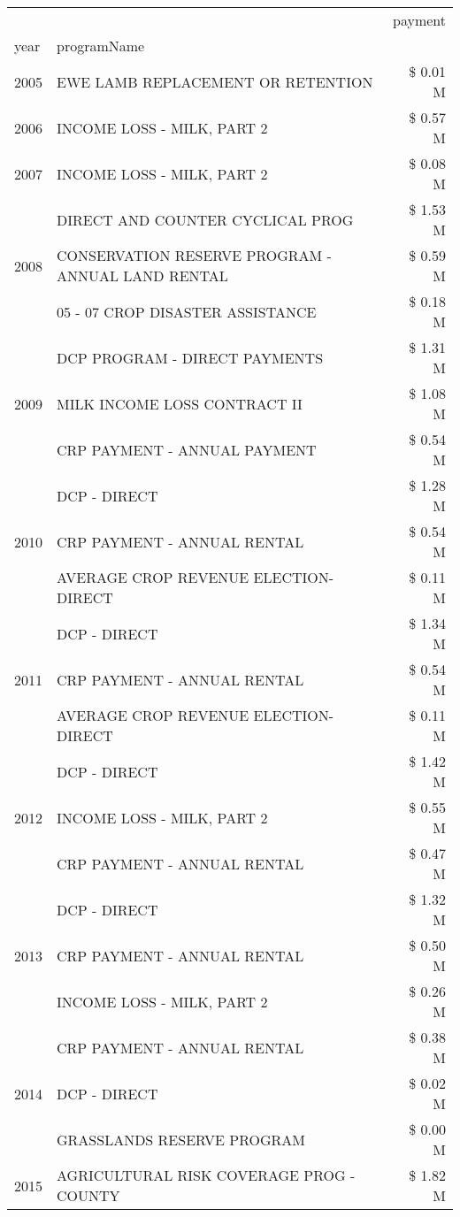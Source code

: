 \begin{tabular}{llr}
\toprule
 &  & payment \\
year & programName &  \\
\midrule
2005 & EWE LAMB REPLACEMENT OR RETENTION & \$ 0.01 M \\
\cline{1-3}
2006 & INCOME LOSS - MILK, PART 2 & \$ 0.57 M \\
\cline{1-3}
2007 & INCOME LOSS - MILK, PART 2 & \$ 0.08 M \\
\cline{1-3}
\multirow[t]{3}{*}{2008} & DIRECT AND COUNTER CYCLICAL PROG & \$ 1.53 M \\
 & CONSERVATION RESERVE PROGRAM - ANNUAL LAND RENTAL & \$ 0.59 M \\
 & 05 - 07 CROP DISASTER ASSISTANCE & \$ 0.18 M \\
\cline{1-3}
\multirow[t]{3}{*}{2009} & DCP PROGRAM - DIRECT PAYMENTS & \$ 1.31 M \\
 & MILK INCOME LOSS CONTRACT II & \$ 1.08 M \\
 & CRP PAYMENT - ANNUAL PAYMENT & \$ 0.54 M \\
\cline{1-3}
\multirow[t]{3}{*}{2010} & DCP - DIRECT & \$ 1.28 M \\
 & CRP PAYMENT - ANNUAL RENTAL & \$ 0.54 M \\
 & AVERAGE CROP REVENUE ELECTION-DIRECT & \$ 0.11 M \\
\cline{1-3}
\multirow[t]{3}{*}{2011} & DCP - DIRECT & \$ 1.34 M \\
 & CRP PAYMENT - ANNUAL RENTAL & \$ 0.54 M \\
 & AVERAGE CROP REVENUE ELECTION-DIRECT & \$ 0.11 M \\
\cline{1-3}
\multirow[t]{3}{*}{2012} & DCP - DIRECT & \$ 1.42 M \\
 & INCOME LOSS - MILK, PART 2 & \$ 0.55 M \\
 & CRP PAYMENT - ANNUAL RENTAL & \$ 0.47 M \\
\cline{1-3}
\multirow[t]{3}{*}{2013} & DCP - DIRECT & \$ 1.32 M \\
 & CRP PAYMENT - ANNUAL RENTAL & \$ 0.50 M \\
 & INCOME LOSS - MILK, PART 2 & \$ 0.26 M \\
\cline{1-3}
\multirow[t]{3}{*}{2014} & CRP PAYMENT - ANNUAL RENTAL & \$ 0.38 M \\
 & DCP - DIRECT & \$ 0.02 M \\
 & GRASSLANDS RESERVE PROGRAM & \$ 0.00 M \\
\cline{1-3}
\multirow[t]{3}{*}{2015} & AGRICULTURAL RISK COVERAGE PROG - COUNTY & \$ 1.82 M \\

\end{tabular}
